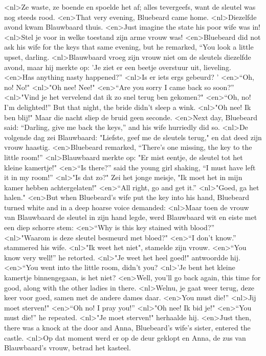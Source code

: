 <nl>Ze waste, ze boende en spoelde het af; alles tevergeefs, want de sleutel was nog steeds rood.
<en>That very evening, Bluebeard came home.
<nl>Diezelfde avond kwam Blauwbaard thuis.
<en>Just imagine the state his poor wife was in!
<nl>Stel je voor in welke toestand  zijn arme vrouw was!
<en>Bluebeard did not ask his wife for the keys that same evening, but he remarked, “You look a little upset, darling.
<nl>Blauwbaard vroeg  zijn vrouw niet om de sleutels  diezelfde avond, maar hij merkte op: 'Je ziet er een beetje overstuur uit, lieveling.
<en>Has anything nasty happened?”
<nl>Is er iets ergs gebeurd? '
<en>“Oh, no! No!"
<nl>"Oh nee! Nee!"
<en>“Are you sorry I came back so soon?”
<nl>"Vind je het vervelend  dat ik zo snel terug ben gekomen?"
<en>“Oh, no! I’m delighted!” But that night, the bride didn’t sleep a wink.
<nl>"Oh nee! Ik ben blij!" Maar die nacht sliep de bruid geen seconde.
<en>Next day, Bluebeard said:  “Darling, give me back the keys,” and his wife hurriedly did so.
<nl>De volgende dag zei Blauwbaard: "Liefste, geef me de sleutels terug," en dat deed zijn vrouw haastig.
<en>Bluebeard remarked, “There’s one missing, the key to the little room!”
<nl>Blauwbaard merkte op: "Er mist eentje, de sleutel tot het kleine kamertje!"
<en>“Is there?” said the young girl shaking, “I must have left it in my room!”
<nl>"Is dat zo?" Zei het jonge meisje, "Ik moet het in mijn kamer hebben achtergelaten!"
<en>“All right, go and get it.” 
<nl>"Goed, ga het halen." 
<en>But when Bluebeard’s wife put the key into his hand, Bluebeard turned white and in a deep hoarse voice demanded:
<nl>Maar toen de vrouw van Blauwbaard de sleutel in zijn hand legde, werd Blauwbaard wit en eiste met een diep schorre stem:
<en>“Why is this key stained with blood?”
<nl>"Waarom is deze sleutel besmeurd met bloed?"
<en>“I don’t know.” stammered his wife.
<nl>"Ik weet het niet", stamelde zijn vrouw.
<en>“You know very well!” he retorted.
<nl>"Je weet het heel goed!" antwoordde hij.
<en>“You went into the little room, didn’t you?
<nl>'Je bent het kleine kamertje binnengegaan, is het niet?
<en>Well, you’ll go back again, this time for good, along with the other ladies in there.
<nl>Welnu, je gaat weer terug, deze keer voor goed, samen met de andere dames daar.
<en>You must die!”
<nl>Jij moet sterven!"
<en>“Oh no! I pray you!”
<nl>"Oh nee! Ik bid je!"
<en>“You must die!” he repeated.
<nl>"Je moet sterven!" herhaalde hij.
<en>Just then, there was a knock at the door and Anna, Bluebeard’s wife’s sister, entered the castle.
<nl>Op dat moment werd er op de deur geklopt en Anna, de zus van Blauwbaard's vrouw, betrad het kasteel.
